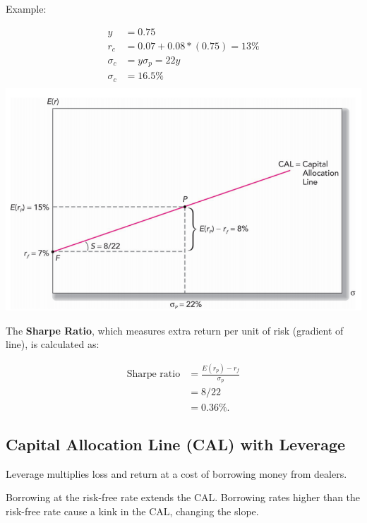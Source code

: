 \documentclass[
]{book}
\begin{document}
Example:

\[
\begin{aligned}
y        &= 0.75 \\
r_𝑐     &= 0.07+0.08*(0.75) = 13\% \\
\sigma_c &= y \sigma_𝑝=22𝑦\\
\sigma_c &= 16.5\% \\
\end{aligned}
\] \includegraphics{Resources/capaloocation1.png}

The \textbf{Sharpe Ratio}, which measures extra return per unit of risk
(gradient of line), is calculated as:

\[
\begin{aligned}
\text{Sharpe ratio} &= \frac{E(r_p) - r_f}{ \sigma_p}\\
&= 8/22 \\
&= 0.36\%. 
\end{aligned}
\]

\hypertarget{capital-allocation-line-cal-with-leverage}{%
\subsection{Capital Allocation Line (CAL) with
Leverage}\label{capital-allocation-line-cal-with-leverage}}

Leverage multiplies loss and return at a cost of borrowing money from
dealers.

Borrowing at the risk-free rate extends the CAL. Borrowing rates higher
than the risk-free rate cause a kink in the CAL, changing the slope.
\end{document}
